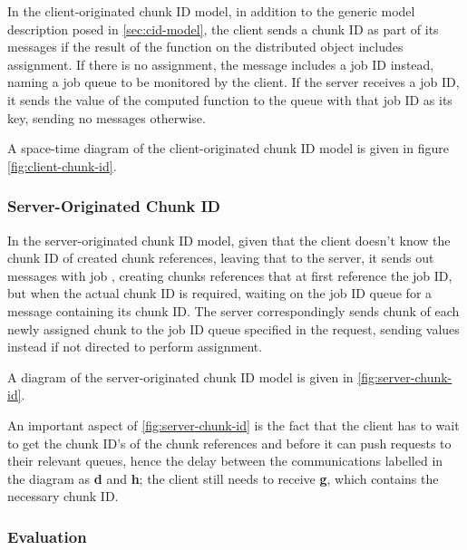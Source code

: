 In the client-originated chunk ID  model, in addition to the generic model description posed in \cref{sec:cid-model}, the client sends a chunk ID as part of its messages if the result of the function on the distributed object includes assignment.
If there is no assignment, the message includes a job ID instead, naming a job queue to be monitored by the client.
If the server receives a job ID, it sends the value of the computed function to the queue with that job ID as its key, sending no messages otherwise.

A space-time diagram of the client-originated chunk ID model is given in figure \cref{fig:client-chunk-id}.


\subsubsection{Server-Originated Chunk ID}

In the server-originated chunk ID model, given that the client doesn't know the chunk ID of created chunk references, leaving that to the server, it sends out messages with job , creating chunks references that at first reference the job ID, but when the actual chunk ID is required, waiting on the job ID queue for a message containing its chunk ID.
The server correspondingly sends chunk  of each newly assigned chunk to the job ID queue specified in the request, sending values instead if not directed to perform assignment.

A diagram of the server-originated chunk ID model is given in \cref{fig:server-chunk-id}.


An important aspect of \cref{fig:server-chunk-id} is the fact that the client has to wait to get the chunk ID's of the chunk references  and  before it can push requests to their relevant queues, hence the delay between the communications labelled in the diagram as \textcolor{dark2-3}{\textbf{d}} and \textcolor{dark2-3}{\textbf{h}}; the client still needs to receive \textcolor{dark2-1}{\textbf{g}}, which contains the necessary chunk ID.

\subsubsection{Evaluation}\label{sec:mod-eval}

